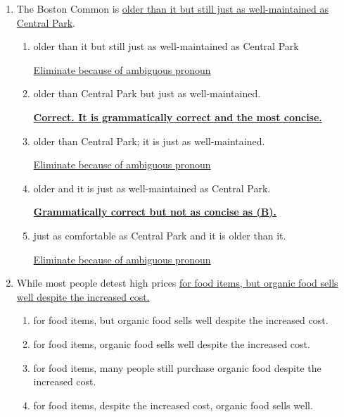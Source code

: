 \begin{enumerate}
\item The Boston Common is \ul{older than it but still just as well-maintained as Central Park}.

\begin{enumerate}[label=(\Alph*)]
\item older than it but still just as well-maintained as Central Park

\ul{Eliminate because of ambiguous pronoun}
  
\item older than Central Park but just as well-maintained.

\textbf{\ul{Correct. It is grammatically correct and the most concise.}}

\item  older than Central Park; it is just as well-maintained.

\ul{Eliminate because of ambiguous pronoun}
  
\item older and it is just as well-maintained as Central Park.

\textbf{\ul{Grammatically correct but not as concise as (B).}}

\item just as comfortable as Central Park and it is older than it.

\ul{Eliminate because of ambiguous pronoun}
\end{enumerate}

\bigskip
\item While most people detest high prices \ul{for food items, but organic food sells well despite the increased cost.}

\begin{spacing}{1.5}
\begin{enumerate}[label=(\Alph*)]
\item for food items, but organic food sells well despite the increased cost.

\hrulefill
 
\item for food items, organic food sells well despite the increased cost.

\hrulefill
 
\item for food items, many people still purchase organic food despite the increased cost.

\hrulefill

\item for food items, despite the increased cost, organic food sells well.


\end{enumerate}
\end{spacing}
\end{enumerate}
